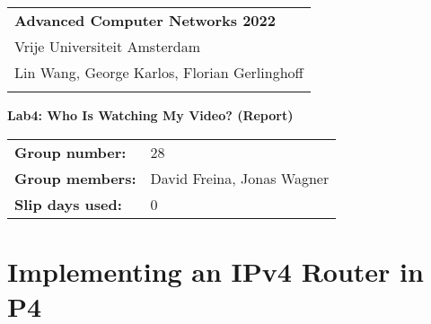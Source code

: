 \documentclass[a4paper,11pt]{article}
\newcommand{\note}[1]{\textit{\textcolor{gray}{#1}}}
\begin{document}
\thispagestyle{empty}

\begin{tabular}{@{}p{15.5cm}}
{\bf Advanced Computer Networks 2022} \\
Vrije Universiteit Amsterdam  \\ Lin Wang, George Karlos, Florian Gerlinghoff\\
\hline
\\
\end{tabular}

\vspace*{0.3cm}

{\LARGE \bf Lab4: Who Is Watching My Video? (Report)}

\vspace*{0.3cm}


\begin{tcolorbox}[sharp corners, colback=blue!5!white]
\begin{tabular}{@{}ll}
\textbf{Group number:} & 28 \\
\textbf{Group members:} & David Freina, Jonas Wagner \\
\textbf{Slip days used:} & 0 \\
\end{tabular}
\end{tcolorbox}

\vspace{0.4cm}


\section{Implementing an IPv4 Router in P4}
\label{sec:implementing-router}
\end{document}
